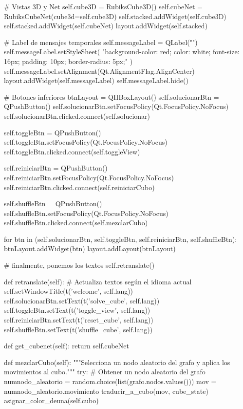         # Vistas 3D y Net
        self.cube3D  = RubiksCube3D()
        self.cubeNet = RubiksCubeNet(cube3d=self.cube3D)
        self.stacked.addWidget(self.cube3D)
        self.stacked.addWidget(self.cubeNet)
        layout.addWidget(self.stacked)

        # Label de mensajes temporales
        self.messageLabel = QLabel("")
        self.messageLabel.setStyleSheet(
            "background-color: red; color: white; font-size: 16px; padding: 10px; border-radius: 5px;"
        )
        self.messageLabel.setAlignment(Qt.AlignmentFlag.AlignCenter)
        layout.addWidget(self.messageLabel)
        self.messageLabel.hide()

        # Botones inferiores
        btnLayout = QHBoxLayout()
        self.solucionarBtn = QPushButton()
        self.solucionarBtn.setFocusPolicy(Qt.FocusPolicy.NoFocus)
        self.solucionarBtn.clicked.connect(self.solucionar)

        self.toggleBtn = QPushButton()
        self.toggleBtn.setFocusPolicy(Qt.FocusPolicy.NoFocus)
        self.toggleBtn.clicked.connect(self.toggleView)

        self.reiniciarBtn = QPushButton()
        self.reiniciarBtn.setFocusPolicy(Qt.FocusPolicy.NoFocus)
        self.reiniciarBtn.clicked.connect(self.reiniciarCubo)

        self.shuffleBtn = QPushButton()
        self.shuffleBtn.setFocusPolicy(Qt.FocusPolicy.NoFocus)
        self.shuffleBtn.clicked.connect(self.mezclarCubo)

        for btn in (self.solucionarBtn, self.toggleBtn, self.reiniciarBtn, self.shuffleBtn):
            btnLayout.addWidget(btn)
        layout.addLayout(btnLayout)

        # finalmente, ponemos los textos
        self.retranslate()
        
    def retranslate(self):
        # Actualiza textos según el idioma actual
        self.setWindowTitle(t('welcome', self.lang))
        self.solucionarBtn.setText(t('solve_cube', self.lang))
        self.toggleBtn.setText(t('toggle_view', self.lang))
        self.reiniciarBtn.setText(t('reset_cube', self.lang))
        self.shuffleBtn.setText(t('shuffle_cube', self.lang))

    
    def get_cubenet(self):
        return self.cubeNet
    
    def mezclarCubo(self):
        """Selecciona un nodo aleatorio del grafo y aplica los movimientos al cubo."""
        try:
            # Obtener un nodo aleatorio del grafo
            numnodo_aleatorio = random.choice(list(grafo.nodos.values()))
            mov = numnodo_aleatorio.movimiento
            traducir_a_cubo(mov, cube_state)
            asignar_color_deuna(self.cubo)

